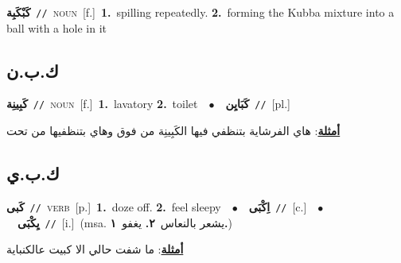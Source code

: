 \documentclass[10pt,a4paper,twoside]{article} %
\begin{document}
\begin{multicols}{2}
{\setlength\topsep{0pt}\textbf{\foreignlanguage{arabic}{كَبْكَبِة}}\ {\color{gray}\texttt{//}\color{black}}\ \textsc{noun}\ [f.]\ \textbf{1.}~spilling repeatedly.  \textbf{2.}~forming the Kubba mixture into a ball with a hole in it\ } \vspace{2mm}

\vspace{-3mm}
\subsection*{\color{blue}\foreignlanguage{arabic}{ك.ب.ن}\color{blue}{}} 

{\setlength\topsep{0pt}\textbf{\foreignlanguage{arabic}{كَبِينِة}}\ {\color{gray}\texttt{//}\color{black}}\ \textsc{noun}\ [f.]\ \textbf{1.}~lavatory  \textbf{2.}~toilet\ \ $\bullet$\ \ \setlength\topsep{0pt}\textbf{\foreignlanguage{arabic}{كَبَايِن}}\ {\color{gray}\texttt{//}\color{black}}\ [pl.]\  \begin{flushright}\color{gray}\foreignlanguage{arabic}{\textbf{\underline{\foreignlanguage{arabic}{أمثلة}}}: هاي الفرشاية بتنظفي فيها الكَبِينِة من فوق وهاي بتنظفيها من تحت}\end{flushright}\color{black}} \vspace{2mm}

\vspace{-3mm}
\subsection*{\color{blue}\foreignlanguage{arabic}{ك.ب.ي}\color{blue}{}} 

{\setlength\topsep{0pt}\textbf{\foreignlanguage{arabic}{كَبى}}\ {\color{gray}\texttt{//}\color{black}}\ \textsc{verb}\ [p.]\ \textbf{1.}~doze off.  \textbf{2.}~feel sleepy\ \ $\bullet$\ \ \setlength\topsep{0pt}\textbf{\foreignlanguage{arabic}{اِكْبَى}}\ {\color{gray}\texttt{//}\color{black}}\ [c.]\ \ $\bullet$\ \ \setlength\topsep{0pt}\textbf{\foreignlanguage{arabic}{يِكْبَى}}\ {\color{gray}\texttt{//}\color{black}}\ [i.]\ \color{gray}(msa. \foreignlanguage{arabic}{يشعر بالنعاس}~\foreignlanguage{arabic}{\textbf{٢.}}  \foreignlanguage{arabic}{يغفو}~\foreignlanguage{arabic}{\textbf{١.}})\color{black}\  \begin{flushright}\color{gray}\foreignlanguage{arabic}{\textbf{\underline{\foreignlanguage{arabic}{أمثلة}}}: ما شفت حالي الا كبيت عالكنباية}\end{flushright}\color{black}} \vspace{2mm}


\end{multicols}
\end{document}
